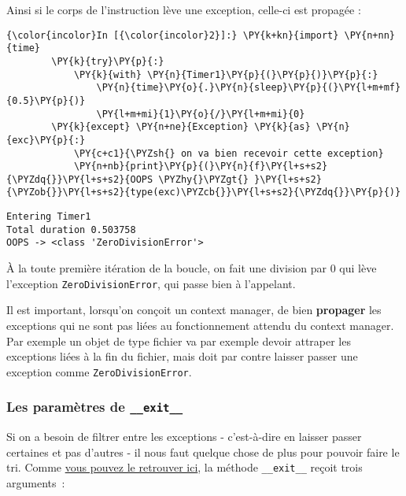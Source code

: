     Ainsi si le corps de l'instruction lève une exception, celle-ci est
propagée :

    \begin{Verbatim}[commandchars=\\\{\}]
{\color{incolor}In [{\color{incolor}2}]:} \PY{k+kn}{import} \PY{n+nn}{time}
        \PY{k}{try}\PY{p}{:}
            \PY{k}{with} \PY{n}{Timer1}\PY{p}{(}\PY{p}{)}\PY{p}{:}
                \PY{n}{time}\PY{o}{.}\PY{n}{sleep}\PY{p}{(}\PY{l+m+mf}{0.5}\PY{p}{)}
                \PY{l+m+mi}{1}\PY{o}{/}\PY{l+m+mi}{0}
        \PY{k}{except} \PY{n+ne}{Exception} \PY{k}{as} \PY{n}{exc}\PY{p}{:}
            \PY{c+c1}{\PYZsh{} on va bien recevoir cette exception}
            \PY{n+nb}{print}\PY{p}{(}\PY{n}{f}\PY{l+s+s2}{\PYZdq{}}\PY{l+s+s2}{OOPS \PYZhy{}\PYZgt{} }\PY{l+s+s2}{\PYZob{}}\PY{l+s+s2}{type(exc)\PYZcb{}}\PY{l+s+s2}{\PYZdq{}}\PY{p}{)}
\end{Verbatim}


    \begin{Verbatim}[commandchars=\\\{\}]
Entering Timer1
Total duration 0.503758
OOPS -> <class 'ZeroDivisionError'>

    \end{Verbatim}

    À la toute première itération de la boucle, on fait une division par 0
qui lève l'exception \texttt{ZeroDivisionError}, qui passe bien à
l'appelant.

Il est important, lorsqu'on conçoit un context manager, de bien
\textbf{propager} les exceptions qui ne sont pas liées au fonctionnement
attendu du context manager. Par exemple un objet de type fichier va par
exemple devoir attraper les exceptions liées à la fin du fichier, mais
doit par contre laisser passer une exception comme
\texttt{ZeroDivisionError}.

    \hypertarget{les-paramuxe8tres-de-__exit__}{%
\subsubsection{\texorpdfstring{Les paramètres de
\texttt{\_\_exit\_\_}}{Les paramètres de \_\_exit\_\_}}\label{les-paramuxe8tres-de-__exit__}}

    Si on a besoin de filtrer entre les exceptions - c'est-à-dire en laisser
passer certaines et pas d'autres - il nous faut quelque chose de plus
pour pouvoir faire le tri. Comme
\href{https://docs.python.org/3/reference/datamodel.html\#with-statement-context-managers}{vous
pouvez le retrouver ici}, la méthode \texttt{\_\_exit\_\_} reçoit trois
arguments~:


